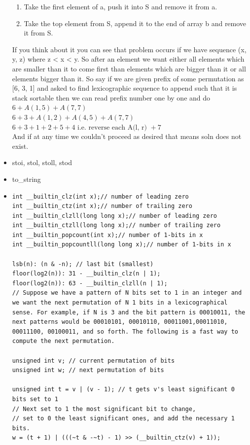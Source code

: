 \documentclass[8pt, a4paper, oneside, twocolumn]{extarticle}
\begin{document}
\begin{itemize}
    \begin{enumerate}
        \item Take the first element of a, push it into S and remove it from a.
        \item Take the top element from S, append it to the end of array b and remove it from S.
    \end{enumerate}
    If you think about it you can see that problem occurs if we have sequence (x, y, z) where z < x < y. So after an element we want either all elements which are smaller than it to come first than elements which are bigger than it or all elements bigger than it. So say if we are given prefix of some permutation as [6, 3, 1] and asked to find lexicographic sequence to append such that it is stack sortable then we can read prefix number one by one and do\\
    $6 + A(1, 5) + A(7, 7)$\\
    $6 + 3 + A(1, 2) + A(4, 5) + A(7, 7)$\\
    $6 + 3 + 1 + 2 + 5 + 4 \text{ i.e. reverse each A(l, r) } + 7$\\
    And if at any time we couldn't proceed as desired that means soln does not exist.
    \item stoi, stol, stoll, stod
    \item to\_{}string
    \item 
    \begin{verbatim}
int __builtin_clz(int x);// number of leading zero
int __builtin_ctz(int x);// number of trailing zero
int __builtin_clzll(long long x);// number of leading zero
int __builtin_ctzll(long long x);// number of trailing zero
int __builtin_popcount(int x);// number of 1-bits in x
int __builtin_popcountll(long long x);// number of 1-bits in x

lsb(n): (n & -n); // last bit (smallest)
floor(log2(n)): 31 - __builtin_clz(n | 1);
floor(log2(n)): 63 - __builtin_clzll(n | 1);
// Suppose we have a pattern of N bits set to 1 in an integer and we want the next permutation of N 1 bits in a lexicographical sense. For example, if N is 3 and the bit pattern is 00010011, the next patterns would be 00010101, 00010110, 00011001,00011010, 00011100, 00100011, and so forth. The following is a fast way to compute the next permutation.

unsigned int v; // current permutation of bits 
unsigned int w; // next permutation of bits

unsigned int t = v | (v - 1); // t gets v's least significant 0 bits set to 1
// Next set to 1 the most significant bit to change, 
// set to 0 the least significant ones, and add the necessary 1 bits.
w = (t + 1) | (((~t & -~t) - 1) >> (__builtin_ctz(v) + 1));  
    \end{verbatim}
\end{itemize}
\end{document}
